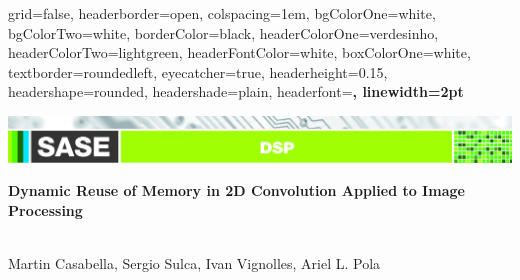 \documentclass[a1paper,portrait,fontscale=0.43]{baposter}
\begin{document}

\begin{poster}
{
grid=false,
headerborder=open, %
colspacing=1em, %
bgColorOne=white, %
bgColorTwo=white, %
borderColor=black, %
headerColorOne=verdesinho, %
headerColorTwo=lightgreen, %
headerFontColor=white, %
boxColorOne=white, %
textborder=roundedleft, %
eyecatcher=true, %
headerheight=0.15\textheight, %
headershape=rounded, %
headershade=plain,
headerfont=\Large\bf\textsf, %
linewidth=2pt %
}
{}
%
%
{  
  {\includegraphics[trim=1.7cm 0 0 5cm, width=247mm]{DSP-02}\vspace{0.2em}}%


  \huge\bf\textsf %
  {Dynamic Reuse of Memory in 2D Convolution Applied to Image Processing}}
{\sf\vspace{0.5em}\\
    Martin Casabella,
    Sergio Sulca,
    Ivan Vignolles,
    Ariel L. Pola
    \small{

}}
\end{poster}
\end{document}

